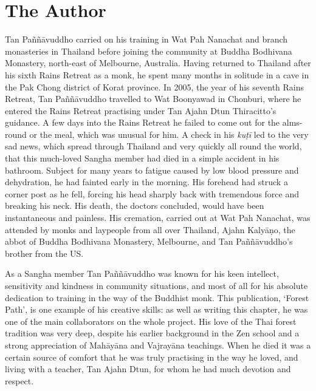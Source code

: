 \dividerRule

\section{The Author}
\label{pannyavuddho-desc}

Tan Paññāvuddho carried on his training in Wat Pah Nanachat and
branch monasteries in Thailand before joining the community at Buddha
Bodhivana Monastery, north-east of Melbourne, Australia. Having returned
to Thailand after his sixth Rains Retreat as a monk, he spent many
months in solitude in a cave in the Pak Chong district of Korat
province. In 2005, the year of his seventh Rains Retreat, Tan
Paññāvuddho travelled to Wat Boonyawad in Chonburi, where he entered the
Rains Retreat practising under Tan Ajahn Dtun Thiracitto's guidance. A
few days into the Rains Retreat he failed to come out for the alms-round
or the meal, which was unusual for him. A check in his \emph{kuṭī} led to the
very sad news, which spread through Thailand and very quickly all round
the world, that this much-loved Sangha member had died in a simple
accident in his bathroom. Subject for many years to fatigue caused by
low blood pressure and dehydration, he had fainted early in the morning. 
His forehead had struck a corner post as he fell, forcing his head
sharply back with tremendous force and breaking his neck. His death, the
doctors concluded, would have been instantaneous and painless. His
cremation, carried out at Wat Pah Nanachat, was attended by monks and
laypeople from all over Thailand, Ajahn Kalyāṇo, the abbot of Buddha
Bodhivana Monastery, Melbourne, and Tan Paññāvuddho's brother from the
US.

As a Sangha member Tan Paññāvuddho was known for his keen
intellect, sensitivity and kindness in community situations, and most of
all for his absolute dedication to training in the way of the Buddhist
monk. This publication, `Forest Path', is one example of his creative
skills: as well as writing this chapter, he was one of the main
collaborators on the whole project. His love of the Thai forest
tradition was very deep, despite his earlier background in the Zen
school and a strong appreciation of Mahāyāna and Vajrayāna teachings. 
When he died it was a certain source of comfort that he was truly
practising in the way he loved, and living with a teacher, Tan Ajahn
Dtun, for whom he had much devotion and respect.

